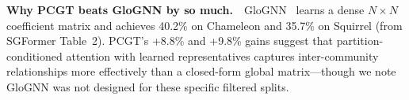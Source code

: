 \textbf{Why PCGT beats GloGNN by so much.}~~GloGNN~\citep{li2022glognn} learns a dense $N \times N$ coefficient matrix and achieves 40.2\% on Chameleon and 35.7\% on Squirrel (from SGFormer Table~2). PCGT's +8.8\% and +9.8\% gains suggest that partition-conditioned attention with learned representatives captures inter-community relationships more effectively than a closed-form global matrix---though we note GloGNN was not designed for these specific filtered splits.
